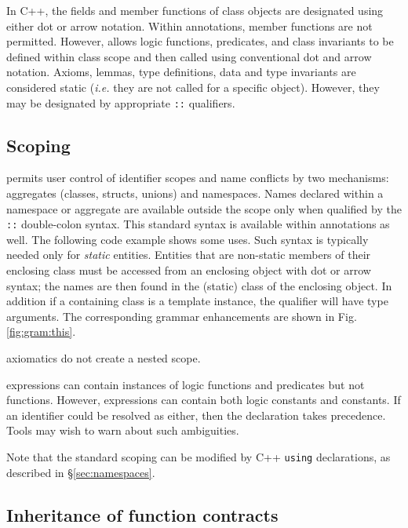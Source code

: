 In C++, the fields and member functions of class objects are
designated using either dot or arrow notation. Within \NAME
annotations, \lang member functions are not permitted. However, \NAME
allows logic functions, predicates, and class invariants to be defined
within class scope and then called using conventional \lang dot and
arrow notation.  Axioms, lemmas, type definitions, data and type
invariants are considered static ({\it i.e.} they are not called for
a specific object). However, they may be designated by appropriate
\lstinline|::| qualifiers.

\subsection{Scoping}

\lang permits user control of identifier scopes and name conflicts by
two mechanisms: aggregates (classes, structs, unions) and namespaces.
Names declared within a namespace or aggregate are available outside
the scope only when qualified by the \lstinline|::| double-colon
syntax. This standard \lang syntax is available within \NAME
annotations as well.  The following code example shows some uses. Such
syntax is typically needed only for \textit{static} entities.
Entities that are non-static members of their enclosing class 
must be accessed from an enclosing object with dot or arrow syntax;
the names are then found in the (static) class of the enclosing object.
In addition if
a containing class is a template instance, the qualifier will have
type arguments. The corresponding grammar enhancements are shown in
Fig. \ref{fig:gram:this}.



\NAME axiomatics do not create a nested scope.

\NAME expressions can contain instances of logic functions and predicates but not \lang functions. However, \NAME expressions can contain both logic constants
and \lang constants. If an identifier could be resolved as either, then the
\lang declaration takes precedence. Tools may wish to warn about such
ambiguities.

Note that the standard scoping can be modified by C++ \lstinline|using| declarations, as described in \S\ref{sec:namespaces}.


\subsection{Inheritance of function contracts}

